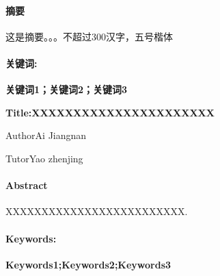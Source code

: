 \paragraph{摘要}{\kaishu {} 这是摘要。。。不超过300汉字，五号楷体}
\vspace{2em}
\paragraph{关键词:}\textbf{ 关键词1；关键词2；关键词3}
\newpage
\thispagestyle{empty}
\begin{center}
	\textbf{\heiti {} Title:XXXXXXXXXXXXXXXXXXXXXX}
	
	\vspace{1em}
	Author\quad Ai Jiangnan
	
	Tutor\quad Yao zhenjing
\end{center}
\vspace{2em}
\paragraph{Abstract}{ XXXXXXXXXXXXXXXXXXXXXXXXX.}
\vspace{2em}
\paragraph{Keywords:}\textbf{ Keywords1;Keywords2;Keywords3}
\newpage
{}
\begin{center}
	\tableofcontents
\end{center}
\thispagestyle{empty}
